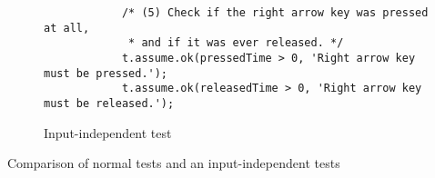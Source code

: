 \begin{listing}[htpb]
\begin{subfigure}[b]{.55\textwidth}
\begin{verbatim}
            /* (5) Check if the right arrow key was pressed at all,
             * and if it was ever released. */
            t.assume.ok(pressedTime > 0, 'Right arrow key must be pressed.');
            t.assume.ok(releasedTime > 0, 'Right arrow key must be released.');
        \end{verbatim}
        \caption{Input-independent test}
    \end{subfigure}
    \caption{Comparison of normal tests and an input-independent tests}
    \label{fig:normal-input-independent-test-comparison}
\end{listing}
\parspace

